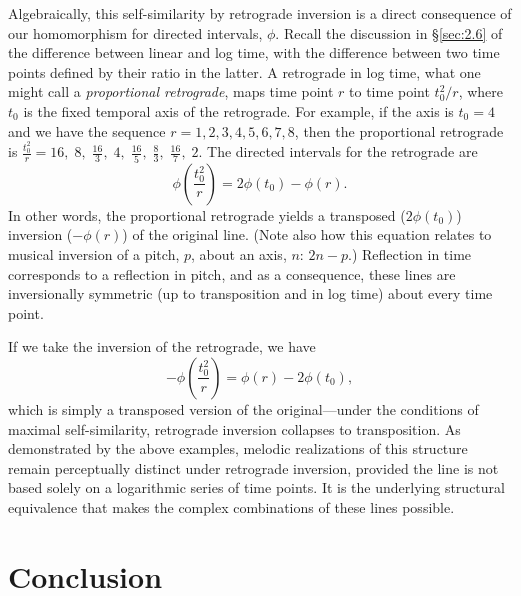 \documentclass[11pt]{article}
\theoremstyle{plain}
\theoremstyle{definition}
\theoremstyle{remark}
\begin{document}
Algebraically, this self-similarity by retrograde inversion is a direct consequence of our homomorphism for directed intervals, $\phi$. Recall the discussion in \S\ref{sec:2.6} of the difference between linear and log time, with the difference between two time points defined by their ratio in the latter. A retrograde in log time, what one might call a \emph{proportional retrograde}, maps time point $r$ to time point $t_0^{2}/r$, where $t_0$ is the fixed temporal axis of the retrograde. For example, if the axis is $t_0 = 4$ and we have the sequence $r = 1, 2, 3, 4, 5, 6, 7, 8$, then the proportional retrograde is $\frac{t_0^{2}}{r} = 16,\; 8,\; \tfrac{16}{3},\; 4,\; \tfrac{16}{5},\; \tfrac{8}{3},\; \tfrac{16}{7},\; 2 .$ The directed intervals for the retrograde are
\begin{equation}
  \phi\!\left(\frac{t_0^{2}}{r}\right) = 2\phi(t_0) - \phi(r).
  \label{eq:proportional-retrograde}
\end{equation}
In other words, the proportional retrograde yields a transposed ($2\phi(t_0)$) inversion ($-\phi(r)$) of the original line. (Note also how this equation relates to musical inversion of a pitch, $p$, about an axis, $n$: $2n - p$.) Reflection in time corresponds to a reflection in pitch, and as a consequence, these lines are inversionally symmetric (up to transposition and in log time) about every time point.

If we take the inversion of the retrograde, we have
\begin{equation}
  -\phi\!\left(\frac{t_0^{2}}{r}\right) = \phi(r) - 2\phi(t_0),
  \label{eq:ri-collapse}
\end{equation}
which is simply a transposed version of the original---under the conditions of maximal self-similarity, retrograde inversion collapses to transposition. As demonstrated by the above examples, melodic realizations of this structure remain perceptually distinct under retrograde inversion, provided the line is not based solely on a logarithmic series of time points. It is the underlying structural equivalence that makes the complex combinations of these lines possible.


\section{Conclusion}
\label{sec:conclusion}
\end{document}
